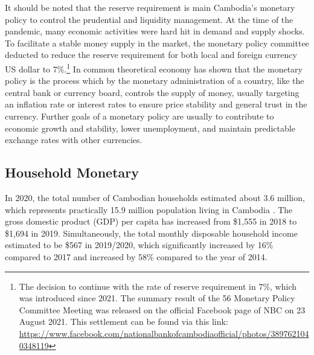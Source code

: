 \documentclass[11pt,letterpaper]{article}
\begin{document}
It should be noted that the reserve requirement is main Cambodia's monetary policy to control the prudential and liquidity management. At the time of the pandemic, many economic activities were hard hit in demand and supply shocks. To facilitate a stable money supply in the market, the monetary policy committee deducted to reduce the reserve requirement for both local and foreign currency US dollar to 7\%.\footnote{The decision to continue with the rate of reserve requirement in 7\%, which was introduced since 2021. The summary result of the 56 Monetary Policy Committee Meeting was released on the official Facebook page of NBC on 23 August 2021. This settlement can be found via this link: \url{https://www.facebook.com/nationalbankofcambodiaofficial/photos/3897621040348119}} In common theoretical economy has shown that the monetary policy is the process which by the monetary administration of a country, like the central bank or currency board, controls the supply of money, usually targeting an inflation rate or interest rates to ensure price stability and general trust in the currency. Further goals of a monetary policy are usually to contribute to economic growth and stability, lower unemployment, and maintain predictable exchange rates with other currencies.

\subsection{Household Monetary}
In 2020, the total number of Cambodian households estimated about 3.6 million, which represents practically 15.9 million population living in Cambodia \cite{NIS2019}. The gross domestic product (GDP) per capita has increased from \$1,555 in 2018 to \$1,694 in 2019. Simultaneously, the total monthly disposable household income estimated to be \$567 in 2019/2020, which significantly increased by 16\% compared to 2017 and increased by 58\% compared to the year of 2014. 
\end{document}
